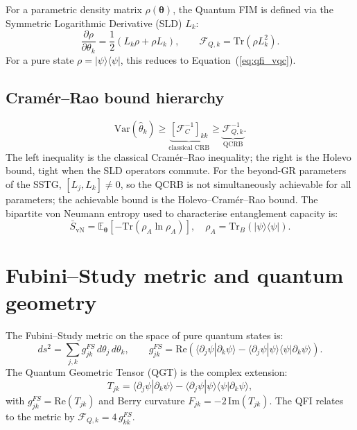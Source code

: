 \documentclass[11pt,a4paper, english]{book}
\theoremstyle{plain}
\theoremstyle{definition}
\numberwithin{equation}{chapter}
\numberwithin{figure}{chapter}
\numberwithin{table}{chapter}
\begin{document}
For a parametric density matrix $\rho(\boldsymbol{\theta})$, the Quantum
FIM is defined via the Symmetric Logarithmic Derivative (SLD) $L_k$:
\begin{equation}
  \label{eq:sld_def}
  \frac{\partial\rho}{\partial\theta_k} =
    \frac{1}{2}(L_k\rho + \rho L_k),
  \qquad
  \mathcal{F}_{Q,k} = \mathrm{Tr}(\rho L_k^2).
\end{equation}
For a pure state $\rho=|\psi\rangle\langle\psi|$, this reduces to
Equation~(\ref{eq:qfi_vqc}).

\subsection{Cram\'{e}r--Rao bound hierarchy}
\label{app:crb-hierarchy}

\begin{equation}
  \label{eq:crb_hierarchy}
  \mathrm{Var}(\hat{\theta}_k) \geq
  \underbrace{\left[\mathcal{F}_C^{-1}\right]_{kk}}_\text{classical CRB}
  \geq
  \underbrace{\mathcal{F}_{Q,k}^{-1}}_\text{QCRB}.
\end{equation}
The left inequality is the classical Cram\'{e}r--Rao inequality; the right
is the Holevo bound, tight when the SLD operators commute. For the
beyond-GR parameters of the SSTG, $[L_j,L_k]\neq0$, so the QCRB is not
simultaneously achievable for all parameters; the achievable bound is the
Holevo--Cram\'{e}r--Rao bound.
The bipartite von Neumann entropy used to characterise entanglement 
capacity is:
\begin{equation}
  \label{eq:vne}
  \bar{S}_\mathrm{vN} = \mathbb{E}_{\boldsymbol{\theta}}\!\left[
    -\mathrm{Tr}\!\left(\rho_A \ln\rho_A\right)
  \right],
  \quad
  \rho_A = \mathrm{Tr}_B\!\left(|\psi\rangle\langle\psi|\right).
\end{equation}
\section{Fubini--Study metric and quantum geometry}
\label{app:fubini-study}

The Fubini--Study metric on the space of pure quantum states is:
\begin{equation}
  \label{eq:fs_metric}
  ds^2 = \sum_{j,k} g_{jk}^{FS}\,d\theta_j\,d\theta_k,
  \qquad
  g_{jk}^{FS} = \mathrm{Re}\!\left(
    \langle\partial_j\psi|\partial_k\psi\rangle
    - \langle\partial_j\psi|\psi\rangle\langle\psi|\partial_k\psi\rangle
  \right).
\end{equation}
The Quantum Geometric Tensor (QGT) is the complex extension:
\begin{equation}
  \label{eq:qgt_def}
  T_{jk} = \langle\partial_j\psi|\partial_k\psi\rangle
          - \langle\partial_j\psi|\psi\rangle\langle\psi|\partial_k\psi\rangle,
\end{equation}
with $g_{jk}^{FS}=\mathrm{Re}(T_{jk})$ and Berry curvature
$F_{jk}=-2\,\mathrm{Im}(T_{jk})$. The QFI relates to the metric by
$\mathcal{F}_{Q,k}=4\,g_{kk}^{FS}$.
\end{document}
